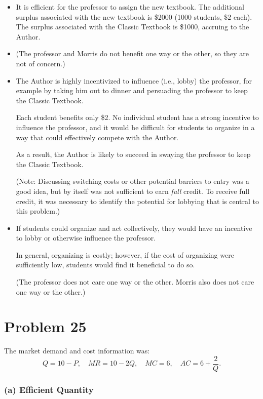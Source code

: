 \documentclass[12pt]{article}
\begin{document}
\begin{itemize}
    \item[a)] It is efficient for the professor to assign the new textbook. The additional surplus associated with the new textbook is \$2000 (1000 students, \$2 each). The surplus associated with the Classic Textbook is \$1000, accruing to the Author.

    \item[]
          (The professor and Morris do not benefit one way or the other, so they are not of concern.)

    \item[b)]
          The Author is highly incentivized to influence (i.e., lobby) the professor, for example by taking him out to dinner and persuading the professor to keep the Classic Textbook.

          Each student benefits only \$2. No individual student has a strong incentive to influence the professor, and it would be difficult for students to organize in a way that could effectively compete with the Author.

          As a result, the Author is likely to succeed in swaying the professor to keep the Classic Textbook.

          (Note: Discussing switching costs or other potential barriers to entry was a good idea, but by itself was not sufficient to earn \emph{full} credit. To receive full credit, it was necessary to identify the potential for lobbying that is central to this problem.)

    \item[c)]
          If students could organize and act collectively, they would have an incentive to lobby or otherwise influence the professor.

          In general, organizing is costly; however, if the cost of organizing were sufficiently low, students would find it beneficial to do so.

          (The professor does not care one way or the other. Morris also does not care one way or the other.)
\end{itemize}

\newpage
\section*{Problem 25}
The market demand and cost information was:
\[
    Q = 10 - P, \quad MR = 10 - 2Q, \quad MC = 6, \quad AC = 6 + \frac{2}{Q}.
\]

\subsubsection*{(a) Efficient Quantity}
\end{document}
